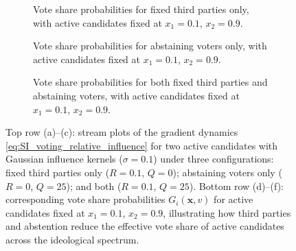 \documentclass{article}
\begin{document}
\begin{figure}[htbp]
            \begin{subfigure}[b]{0.3\linewidth}
                \centering
                
                \caption{Vote share probabilities for fixed third parties only, with active candidates fixed at $x_1 = 0.1$, $x_2 = 0.9$.}
                \label{fig:voting_dynamics:e}
                \vspace{4ex}
            \end{subfigure}
            \begin{subfigure}[b]{0.3\linewidth}
                \centering
                
                \caption{Vote share probabilities for abstaining voters only, with active candidates fixed at $x_1 = 0.1$, $x_2 = 0.9$.}
                \label{fig:voting_dynamics:f}
                \vspace{4ex}
            \end{subfigure}
            \begin{subfigure}[b]{0.3\linewidth}
                \centering
                
                \caption{Vote share probabilities for both fixed third parties and abstaining voters, with active candidates fixed at $x_1 = 0.1$, $x_2 = 0.9$.}
                \label{fig:voting_dynamics:g}
                \vspace{4ex}
            \end{subfigure}

            \caption{Top row (a)--(c): stream plots of the gradient dynamics \cref{eq:SI_voting_relative_influence} for two active candidates with Gaussian influence kernels ($\sigma = 0.1$) under three configurations: fixed third parties only ($R=0.1$, $Q=0$); abstaining voters only ($R=0$, $Q=25$); and both ($R=0.1$, $Q=25$).
                Bottom row (d)--(f): corresponding vote share probabilities $G_i(\mathbf{x},v)$ for active candidates fixed at $x_1=0.1$, $x_2=0.9$, illustrating how third parties and abstention reduce the effective vote share of active candidates across the ideological spectrum.}
            \label{fig:voting_dynamics}
        \end{figure}
\end{document}
